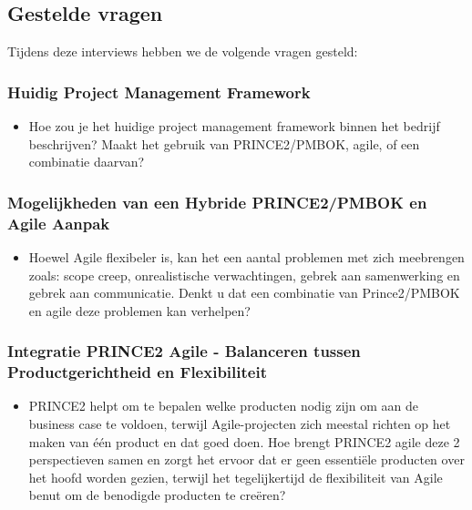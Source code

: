 \documentclass[dutch]{hogent-article}
\begin{document}
\subsection{Gestelde vragen}%
\label{ssec:gestelde-vragen}

Tijdens deze interviews hebben we de volgende vragen gesteld:

\subsubsection{Huidig Project Management Framework}
\label{ssec:Huidig Project Management Framework}

\begin{itemize}
    \item Hoe zou je het huidige project management framework binnen het bedrijf beschrijven? Maakt het gebruik van PRINCE2/PMBOK, agile, of een combinatie daarvan?
\end{itemize}

\subsubsection{Mogelijkheden van een Hybride PRINCE2/PMBOK en Agile Aanpak}
\label{ssec:Mogelijkheden en uitdagingen van een Hybride PRINCE2/PMBOK en Agile Aanpak}

\begin{itemize}
    \item Hoewel Agile flexibeler is, kan het een aantal  problemen met zich meebrengen zoals: scope creep, onrealistische verwachtingen, gebrek aan samenwerking en gebrek aan communicatie. Denkt u dat een combinatie van Prince2/PMBOK en agile deze problemen kan verhelpen?
\end{itemize}

\subsubsection{Integratie PRINCE2 Agile - Balanceren tussen Productgerichtheid en Flexibiliteit}
\label{ssec:Integratie PRINCE2 Agile - Balanceren tussen Productgerichtheid en Flexibiliteit}

\begin{itemize}
    \item PRINCE2 helpt om te bepalen welke producten nodig zijn om aan de business case te voldoen, terwijl Agile-projecten zich meestal richten op het maken van één product en dat goed doen. Hoe brengt PRINCE2 agile deze 2 perspectieven samen en zorgt het ervoor dat er geen essentiële producten over het hoofd worden gezien, terwijl het tegelijkertijd de flexibiliteit van Agile benut om de benodigde producten te creëren?
\end{itemize}
\end{document}
